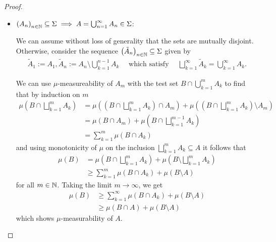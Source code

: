 \begin{proof}
\begin{itemize}
  \item $\left(A_{n}\right)_{n \in \mathbb{N}} \subseteq \Sigma \implies A = \bigcup_{n=1}^{\infty}A_n \in \Sigma$:

    We can assume without loss of generality that the sets are mutually disjoint. Otherwise, consider the sequence $\left(\tilde{A}_{n}\right)_{n \in \mathbb{N}} \subseteq \Sigma$ given by
    \begin{align*}
      \tilde{A}_1 := A_1, \tilde{A}_n := A_n \setminus \bigcup_{k=1}^{n-1}A_k \quad\text{ which satisfy } \quad \bigsqcup_{k=1}^{\infty}\tilde{A}_k = \bigcup_{k=1}^{\infty}A_k.
    \end{align*}

    We can use $\mu$-measureability of $A_m$ with the test set $B\cap \bigcup_{k=1}^{m}A_k$ to find that by induction on $m$
    \begin{align*}
      \mu \left(
        B \cap \bigsqcup_{k=1}^{m}A_k
      \right)
      &=
      \mu \left(
        \left(
          B \cap \bigsqcup_{k=1}^{m}A_k
        \right)
        \cap A_m
      \right)
      +
      \mu \left(
        \left(
          B \cap \bigsqcup_{k=1}^{m}A_k
        \right)
        \setminus A_m
      \right)
      \\
      &=
      \mu(B \cap A_m)
      +
      \mu \left(
        B \cap \bigsqcup_{k=1}^{m-1}A_k
      \right)
      \\
      &= \sum_{k=1}^{m} \mu(B \cap A_k)
    \end{align*}  
    and using monotonicity of $\mu$ on the inclusion
    $\bigsqcup_{k=1}^{m}A_k \subseteq A$ it follows that 
    \begin{align*}
      \mu(B)
      &=
      \mu \left(
        B \cap \bigsqcup_{k=1}^{m}A_k
      \right)
      +
      \mu \left(
        B \setminus \bigsqcup_{k=1}^{m}A_k
      \right)
      \\
      &\geq \sum_{k=1}^{m} \mu(B \cap A_k) + \mu(B \setminus A)
    \end{align*}
    for all $m \in \mathbb{N}$. 
    Taking the limit $m \to \infty$, we get 
    \begin{align*}
      \mu(B) &\geq \sum_{k=1}^{\infty}\mu(B \cap A_k) + \mu(B \setminus A)\\
      &\geq
      \mu(B \cap A) + \mu(B \setminus A)
    \end{align*}
    which shows $\mu$-measurability of $A$.
\end{itemize}
\end{proof}




